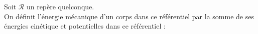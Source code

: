 ﻿\documentclass[a4paper]{article}
\begin{document}
\pagestyle{fancy}
\fancyhf{}
\setlength{\headheight}{15pt}

\begin{center}
	\large{}
\end{center}


Soit \(\mathcal{R}\) un repère quelconque. \\
On définit l'énergie mécanique d'un corps dans ce référentiel par la somme de ses énergies cinétique et potentielles dans ce référentiel :
\begin{center}
\end{center}
\end{document}
